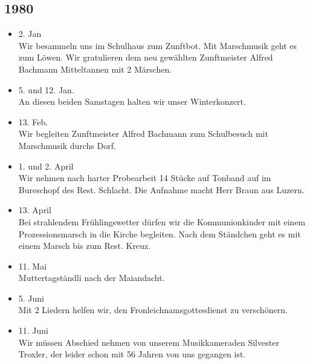 \subsection*{1980}

\begin{history}

    \begin{itemize}

        \item 2. Jan\\
              Wir besammeln uns im Schulhaus zum Zunftbot. Mit Marschmusik geht es zum
              Löwen. Wir gratulieren dem neu gewählten Zunftmeister Alfred Bachmann
              Mitteltannen mit 2 Märschen.

        \item 5. und 12. Jan.\\
              An diesen beiden Samstagen halten wir unser Winterkonzert.

        \item 13. Feb.\\
              Wir begleiten Zunftmeister Alfred Bachmann zum Schulbesuch mit
              Marschmusik durchs Dorf.

        \item 1. und 2. April\\
              Wir nehmen nach harter Probearbeit 14 Stücke auf Tonband auf im
              Bureschopf des Rest. Schlacht. Die Aufnahme macht Herr Braun aus Luzern.

        \item 13. April\\
              Bei strahlendem Frühlingswetter dürfen wir die Kommunionkinder mit einem
              Prozessionsmarsch in die Kirche begleiten. Nach dem Ständchen geht es
              mit einem Marsch bis zum Rest. Kreuz.

        \item 11. Mai\\
              Muttertagständli nach der Maiandacht.

        \item 5. Juni\\
              Mit 2 Liedern helfen wir, den Fronleichnamsgottesdienst zu verschönern.

        \item 11. Juni\\
              Wir müssen Abschied nehmen von unserem Musikkameraden Silvester Troxler,
              der leider schon mit 56 Jahren von uns gegangen ist.


\end{itemize}
\end{history}

